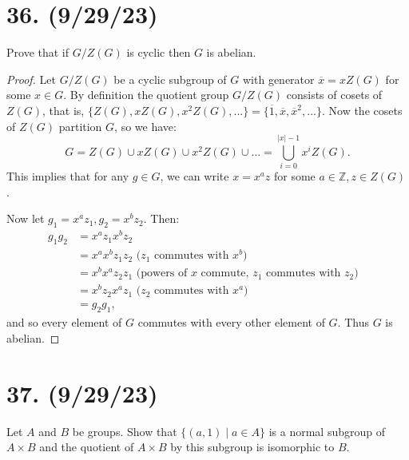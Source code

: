 \documentclass{article}
\begin{document}
\section*{36. (9/29/23)}

Prove that if $G/Z(G)$ is cyclic then $G$ is abelian.

\begin{proof}
    Let $G/Z(G)$ be a cyclic subgroup of $G$ with generator $\overline{x} = xZ(G)$ for some $x \in G$. By definition the quotient group $G/Z(G)$ consists of cosets of $Z(G)$, that is, $\{ Z(G), xZ(G), x^2 Z(G), ... \} = \{ \overline{1}, \overline{x}, \overline{x}^2, ... \}$. Now the cosets of $Z(G)$ partition $G$, so we have:
    \begin{equation*}
        G = Z(G) \cup xZ(G) \cup x^2 Z(G) \cup ... = \bigcup^{|x| - 1}_{i = 0} x^i Z(G).
    \end{equation*}
    This implies that for any $g \in G$, we can write $x = x^a z$ for some $a \in \mathbb{Z}, z \in Z(G)$.

    Now let $g_1 = x^a z_1, g_2 = x^b z_2$. Then:
    \begin{align*}
        g_1 g_2 &= x^a z_1 x^b z_2 & \\
                &= x^a x^b z_1 z_2 \text{ ($z_1$ commutes with $x^b$)} & \\
                &= x^b x^a z_2 z_1 \text{ (powers of $x$ commute, $z_1$ commutes with $z_2$)} & \\
                &= x^b z_2 x^a z_1 \text{ ($z_2$ commutes with $x^a$)} & \\
                &= g_2 g_1,
    \end{align*}
    and so every element of $G$ commutes with every other element of $G$. Thus $G$ is abelian.
\end{proof}

\section*{37. (9/29/23)}

Let $A$ and $B$ be groups. Show that $\{ (a, 1) \mid a \in A \}$ is a normal subgroup of $A \times B$ and the quotient of $A \times B$ by this subgroup is isomorphic to $B$.
\end{document}
